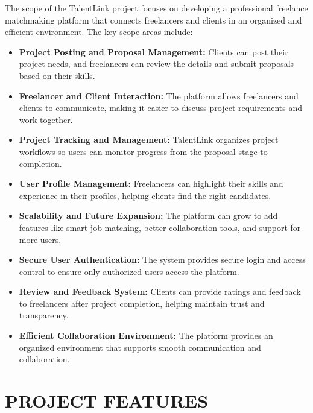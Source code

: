 \documentclass[12pt,a4paper,oneside]{report}
\numberwithin{figure}{chapter}
\numberwithin{table}{chapter}
\begin{document}
\indent The scope of the TalentLink project focuses on developing a professional
freelance matchmaking platform that connects freelancers and clients in an organized and
efficient environment. The key scope areas include:

\begin{itemize}[leftmargin=2em]
  \item \textbf{Project Posting and Proposal Management:} Clients can post their project
        needs, and freelancers can review the details and submit proposals based on their
        skills.
  \item \textbf{Freelancer and Client Interaction:} The platform allows freelancers and
        clients to communicate, making it easier to discuss project requirements and work
        together.
  \item \textbf{Project Tracking and Management:} TalentLink organizes project workflows
        so users can monitor progress from the proposal stage to completion.
  \item \textbf{User Profile Management:} Freelancers can highlight their skills and
        experience in their profiles, helping clients find the right candidates.
  \item \textbf{Scalability and Future Expansion:} The platform can grow to add features
        like smart job matching, better collaboration tools, and support for more users.
  \item \textbf{Secure User Authentication:} The system provides secure login and access
        control to ensure only authorized users access the platform.
  \item \textbf{Review and Feedback System:} Clients can provide ratings and feedback to
        freelancers after project completion, helping maintain trust and transparency.
  \item \textbf{Efficient Collaboration Environment:} The platform provides an organized
        environment that supports smooth communication and collaboration.
\end{itemize}

\section{PROJECT FEATURES}
\end{document}
